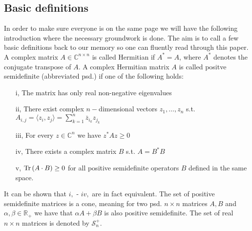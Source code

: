 \subsection{Basic definitions}
In order to make sure everyone is on the same page we will have the following introduction where the necessary groundwork is done. The aim is to call a few basic definitions back to our memory so one can fluently read through this paper. \\
A complex matrix $A \in \mathbb{C}^{n \times n}$ is called Hermitian if $A^*=A$, where $A^*$ denotes the conjugate transpose of $A$. A complex Hermitian matrix $A$ is called positve semidefinite (abbreviated psd.) if one of the following holds: 
\begin{enumerate}
\item[i,] The matrix has only real non-negative eigenvalues 
\item[ii,] There exist complex $n-$dimensional vectors $z_1, \dots, z_n$ s.t. $A_{i,j} = \langle z_i, z_j \rangle = \sum_{k=1}^n \overline{z}_{i_k}z_{j_k}$
\item[iii,] For every $z \in \mathbb{C}^n$ we have $z^*Az\ge 0$
\item[iv,] There exists a complex matrix $B$ s.t. $A=B^*B$
\item[v,] $\text{Tr} \, {(A\cdot B)}  \ge 0 $ for all positive semidefinite operators $ B $ defined in the same space. 
\end{enumerate}
It can be shown that $i,$ - $iv,$ are in fact equivalent. The set of positive semidefinite matrices is a cone, meaning for two psd. $n \times n$ matrices $A,B$ and $\alpha, \beta \in \mathbb{R}_+$ we have that $\alpha A + \beta B $ is also positive semidefinite. The set of real $n \times n$ matrices is denoted by $\mathcal{S}_n^+$.\\
